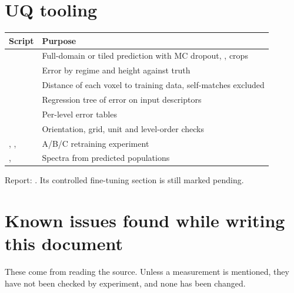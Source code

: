 \section{UQ tooling}
\begin{table}[H]\centering\small
\begin{tabularx}{\linewidth}{lY}
\toprule
Script&Purpose\\\midrule
{}&Full-domain or tiled prediction with MC dropout, ,  crops\\
&Error by regime and height against truth\\
&Distance of each voxel to training data, self-matches excluded\\
&Regression tree of error on input descriptors\\
&Per-level error tables\\
&Orientation, grid, unit and level-order checks\\
, , &A/B/C retraining experiment\\
, &Spectra from predicted populations\\\bottomrule
\end{tabularx}
\end{table}
Report: . Its controlled fine-tuning section is still marked pending.

\section{Known issues found while writing this document}\label{sec:issues}
These come from reading the source. Unless a measurement is mentioned, they have not been checked by experiment, and none has been changed.

